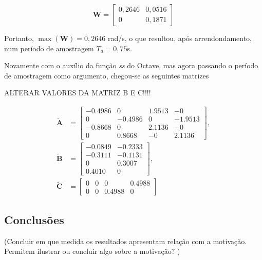 \begin{equation}
    \label{eq:matriz-das-frequencias-de-corte}
    \mathbf{W} = 
        \begin{bmatrix}
            0,2646 & 0,0516\\ 
            0 & 0,1871
        \end{bmatrix}
\end{equation}

Portanto, $\max(\mathbf{W}) = 0,2646$ rad/s, o que resultou, após
arrendondamento, num período de amostragem $T_a = 0,75$s.

Novamente com o auxílio da função \textit{ss} do Octave, mas agora passando o
período de amostragem como argumento, chegou-se as seguintes matrizes

ALTERAR VALORES DA MATRIZ B E C!!!!

\begin{subequations}
    \label{eq:matrizes-do-espaco-de-estados-discretizadas}
    \begin{align}
        \mathbf{\tilde{A}} &= 
        \begin{bmatrix}
            -0.4986  &   0        &  1.9513  &   -0 \\
            0        &   -0.4986  &  0       &   -1.9513    \\
            -0.8668  &   0        &  2.1136  &   -0 \\
            0        &   0.8668   &  -0      &    2.1136         
        \end{bmatrix},  \label{eq:matriz-til-a} \\
        \mathbf{\tilde{B}} &=
        \begin{bmatrix}
            -0.0849 & -0.2333  \\
            -0.3111 & -0.1131  \\
            0       &  0.3007  \\
            0.4010  &  0
        \end{bmatrix},  \label{eq:matriz-til-b} \\
        \mathbf{\tilde{C}} &=
        \begin{bmatrix}
            0    &    0  &      0  & 0.4988  \\
            0    &    0  & 0.4988  & 0
        \end{bmatrix}   \label{eq:matriz-til-c}
    \end{align}
\end{subequations}

\subsection{Conclusões}
(Concluir em que medida os resultados apresentam relação com a motivação.
Permitem ilustrar ou concluir algo sobre a motivação? )
